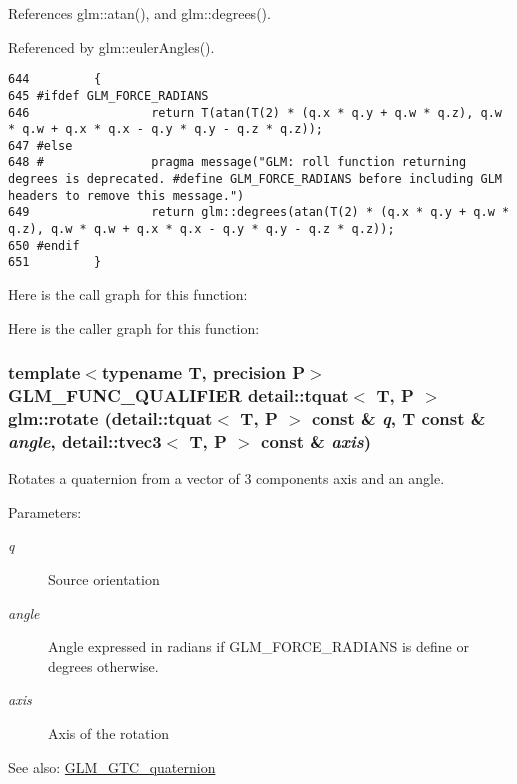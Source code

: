 References glm::atan(), and glm::degrees().

Referenced by glm::eulerAngles().

\begin{Code}\begin{verbatim}644         {
645 #ifdef GLM_FORCE_RADIANS
646                 return T(atan(T(2) * (q.x * q.y + q.w * q.z), q.w * q.w + q.x * q.x - q.y * q.y - q.z * q.z));
647 #else
648 #               pragma message("GLM: roll function returning degrees is deprecated. #define GLM_FORCE_RADIANS before including GLM headers to remove this message.")
649                 return glm::degrees(atan(T(2) * (q.x * q.y + q.w * q.z), q.w * q.w + q.x * q.x - q.y * q.y - q.z * q.z));
650 #endif
651         }
\end{verbatim}
\end{Code}




Here is the call graph for this function:

Here is the caller graph for this function:\hypertarget{group__gtc__quaternion_gca43bc964b553c2bde6a60499c1f2b50}{
\subsubsection[rotate]{\setlength{\rightskip}{0pt plus 5cm}template$<$typename T, precision P$>$ GLM\_\-FUNC\_\-QUALIFIER detail::tquat$<$ T, P $>$ glm::rotate (detail::tquat$<$ T, P $>$ const \& {\em q}, \/  T const \& {\em angle}, \/  detail::tvec3$<$ T, P $>$ const \& {\em axis})}}
\label{group__gtc__quaternion_gca43bc964b553c2bde6a60499c1f2b50}


Rotates a quaternion from a vector of 3 components axis and an angle.

\begin{Desc}
\item[Parameters:]
\begin{description}
\item[{\em q}]Source orientation \item[{\em angle}]Angle expressed in radians if GLM\_\-FORCE\_\-RADIANS is define or degrees otherwise. \item[{\em axis}]Axis of the rotation\end{description}
\end{Desc}
\begin{Desc}
\item[See also:]\hyperlink{group__gtc__quaternion}{GLM\_\-GTC\_\-quaternion} \end{Desc}


